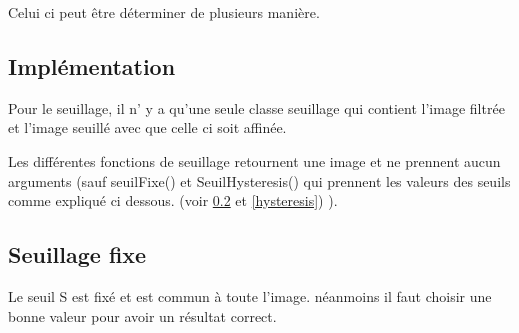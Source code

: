 \documentclass[11pt]{article}
\begin{document}
	Celui ci peut être déterminer de plusieurs manière.

	\subsection{Implémentation}

	Pour le seuillage, il n' y a qu'une seule classe seuillage qui contient l'image filtrée et l'image seuillé avec que celle ci soit affinée.

	Les différentes fonctions de seuillage retournent une image et ne prennent aucun arguments (sauf seuilFixe() et SeuilHysteresis() qui prennent les valeurs des seuils comme expliqué ci dessous. (voir \ref{fixe} et \ref{hysteresis}) ).

	\subsection{Seuillage fixe}\label{fixe}

	Le seuil S est fixé et est commun à toute l'image. néanmoins il faut choisir une bonne valeur pour avoir un résultat correct.
\end{document}

